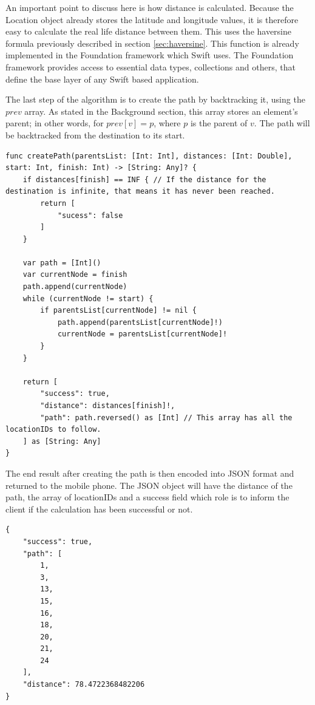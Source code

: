 An important point to discuss here is how distance is calculated. Because the Location object already stores the latitude and longitude values, it is therefore easy to calculate the real life distance between them. This uses the haversine formula previously described in section \ref{sec:haversine}. This function is already implemented in the Foundation framework which Swift uses. The Foundation framework provides access to essential data types, collections and others, that define the base layer of any Swift based application. 

The last step of the algorithm is to create the path by backtracking it, using the $prev$ array. As stated in the Background section, this array stores an element's parent; in other words, for $prev[v] = p$, where $p$ is the parent of $v$. The path will be backtracked from the destination to its start.

\begin{lstlisting}
func createPath(parentsList: [Int: Int], distances: [Int: Double], start: Int, finish: Int) -> [String: Any]? {
    if distances[finish] == INF { // If the distance for the destination is infinite, that means it has never been reached.
        return [
            "sucess": false
        ]
    }
    
    var path = [Int]()
    var currentNode = finish
    path.append(currentNode)
    while (currentNode != start) {
        if parentsList[currentNode] != nil {
            path.append(parentsList[currentNode]!)
            currentNode = parentsList[currentNode]!
        }
    }
        
    return [
        "success": true,
        "distance": distances[finish]!,
        "path": path.reversed() as [Int] // This array has all the locationIDs to follow.
    ] as [String: Any]
}
\end{lstlisting}

The end result after creating the path is then encoded into JSON format and returned to the mobile phone. The JSON object will have the distance of the path, the array of locationIDs and a success field which role is to inform the client if the calculation has been successful or not.

\begin{lstlisting}
{
    "success": true,
    "path": [
        1,
        3,
        13,
        15,
        16,
        18,
        20,
        21,
        24
    ],
    "distance": 78.4722368482206
}
\end{lstlisting}

